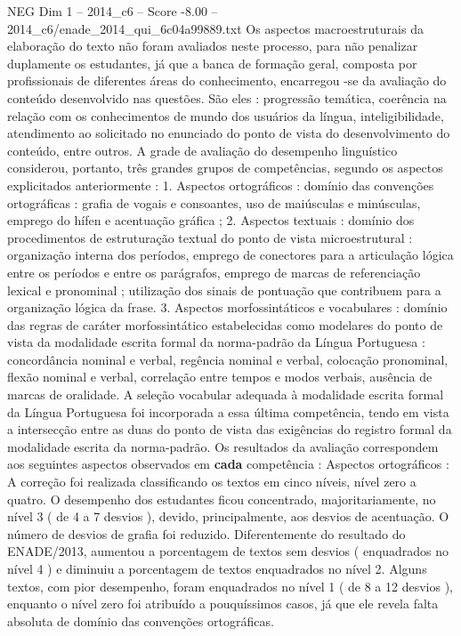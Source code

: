 \begin{textsample}{NEG Dim 1 – 2014\_c6 – Score -8.00 – 2014\_c6/enade\_2014\_qui\_6c04a99889.txt}
Os aspectos macroestruturais da elaboração do texto não foram avaliados neste processo, para não penalizar duplamente os estudantes, já que a banca de formação geral, composta por profissionais de diferentes áreas do conhecimento, encarregou -se da avaliação do conteúdo desenvolvido nas questões.
São eles : progressão temática, coerência na relação com os conhecimentos de mundo dos usuários da língua, inteligibilidade, atendimento ao solicitado no enunciado do ponto de vista do desenvolvimento do conteúdo, entre outros.
A grade de avaliação do desempenho linguístico considerou, portanto, três grandes grupos de competências, segundo os aspectos explicitados anteriormente : 1.
Aspectos ortográficos : domínio das convenções ortográficas : grafia de vogais e consoantes, uso de maiúsculas e minúsculas, emprego do hífen e acentuação gráfica ; 2.
Aspectos textuais : domínio dos procedimentos de estruturação textual do ponto de vista microestrutural : organização interna dos períodos, emprego de conectores para a articulação lógica entre os períodos e entre os parágrafos, emprego de marcas de referenciação lexical e pronominal ; utilização dos sinais de pontuação que contribuem para a organização lógica da frase. 3.
Aspectos morfossintáticos e vocabulares : domínio das regras de caráter morfossintático estabelecidas como modelares do ponto de vista da modalidade escrita formal da norma-padrão da Língua Portuguesa : concordância nominal e verbal, regência nominal e verbal, colocação pronominal, flexão nominal e verbal, correlação entre tempos e modos verbais, ausência de marcas de oralidade.
A seleção vocabular adequada à modalidade escrita formal da Língua Portuguesa foi incorporada a essa última competência, tendo em vista a intersecção entre as duas do ponto de vista das exigências do registro formal da modalidade escrita da norma-padrão.
Os resultados da avaliação correspondem aos seguintes aspectos observados em \textbf{cada} competência : Aspectos ortográficos : A correção foi realizada classificando os textos em cinco níveis, nível zero a quatro.
O desempenho dos estudantes ficou concentrado, majoritariamente, no nível 3 ( de 4 a 7 desvios ), devido, principalmente, aos desvios de acentuação.
O número de desvios de grafia foi reduzido.
Diferentemente do resultado do ENADE/2013, aumentou a porcentagem de textos sem desvios ( enquadrados no nível 4 ) e diminuiu a porcentagem de textos enquadrados no nível 2.
Alguns textos, com pior desempenho, foram enquadrados no nível 1 ( de 8 a 12 desvios ), enquanto o nível zero foi atribuído a pouquíssimos casos, já que ele revela falta absoluta de domínio das convenções ortográficas.

\end{textsample}
